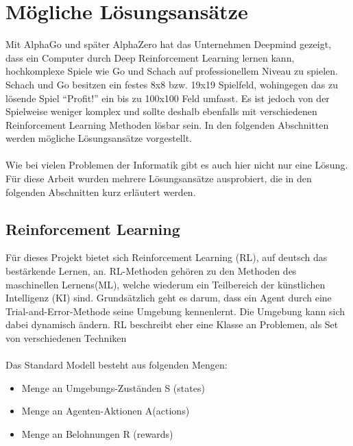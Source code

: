 \section{Mögliche Lösungsansätze}\label{cap:loesungsansatze}
Mit AlphaGo und später AlphaZero hat das Unternehmen Deepmind gezeigt, dass ein Computer durch Deep Reinforcement Learning lernen kann, hochkomplexe Spiele wie Go und Schach auf professionellem Niveau zu spielen.  Schach und Go besitzen ein festes 8x8 bzw. 19x19 Spielfeld, wohingegen das zu lösende Spiel “Profit!” ein bis zu 100x100 Feld umfasst. Es ist jedoch von der Spielweise weniger komplex und sollte deshalb ebenfalls mit verschiedenen Reinforcement Learning Methoden lösbar sein. In den folgenden Abschnitten werden mögliche Lösungsansätze vorgestellt. 
\\\\
Wie bei vielen Problemen der Informatik gibt es auch hier nicht nur eine Lösung. Für diese Arbeit wurden mehrere Lösungsansätze ausprobiert, die in den folgenden Abschnitten kurz erläutert werden.

\subsection{Reinforcement Learning}
Für dieses Projekt bietet sich Reinforcement Learning (RL), auf deutsch das bestärkende Lernen, an. RL-Methoden gehören zu den Methoden des maschinellen Lernens(ML), welche wiederum ein Teilbereich der künstlichen Intelligenz (KI) sind. Grundsätzlich geht es darum, dass ein Agent durch eine Trial-and-Error-Methode seine Umgebung kennenlernt. Die Umgebung kann sich dabei dynamisch ändern. RL beschreibt eher eine Klasse an Problemen, als Set von verschiedenen Techniken 
\\\\
Das Standard Modell besteht aus folgenden Mengen:
\begin{itemize}
	\item Menge an Umgebungs-Zuständen S (states)
	\item Menge an Agenten-Aktionen A(actions)
	\item Menge an Belohnungen R (rewards)
\end{itemize}

